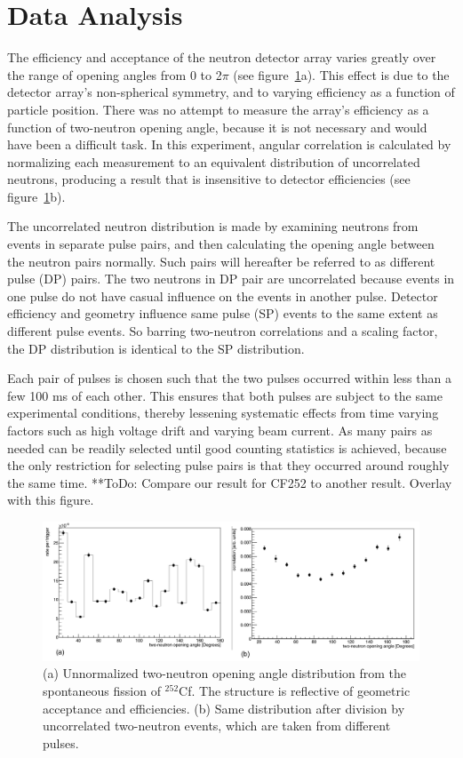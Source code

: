 \section{Data Analysis}
\label{Analysis}
The efficiency and acceptance of the neutron detector array varies greatly over the range of opening angles from 0 to 2$\pi$ (see figure~\ref{fig:OpeningAngleAcceptance}a). This effect is due to the detector array's non-spherical symmetry, and to varying efficiency as a function of particle position. There was no attempt to measure the array's efficiency as a function of two-neutron opening angle, because it is not necessary and would have been a difficult task. In this experiment, angular correlation is calculated by normalizing each measurement to an equivalent distribution of uncorrelated neutrons, producing a result that is insensitive to detector efficiencies (see figure~\ref{fig:OpeningAngleAcceptance}b). 

The uncorrelated neutron distribution is made by examining neutrons from events in separate pulse pairs, and then calculating the opening angle between the neutron pairs normally. Such pairs will hereafter be referred to as different pulse (DP) pairs. The two neutrons in DP pair are uncorrelated because events in one pulse do not have casual influence on the events in another pulse. Detector efficiency and geometry influence same pulse (SP) events to the same extent as different pulse events. So barring two-neutron correlations and a scaling factor, the DP distribution is identical to the SP distribution.

Each pair of pulses is chosen such that the two pulses occurred within less than a few 100 ms of each other. This ensures that both pulses are subject to the same experimental conditions, thereby lessening systematic effects from time varying factors such as high voltage drift and varying beam current. As many pairs as needed can be readily selected until good counting statistics is achieved, because the only restriction for selecting pulse pairs is that they occurred around roughly the same time.
**ToDo: Compare our result for CF252 to another result. Overlay with this figure.
\begin{figure}
    \centering
    \includegraphics[width  = \textwidth ]{Content/Methods/Normalization.png}
    \caption{(a) Unnormalized two-neutron opening angle distribution from the spontaneous fission of $^{252}$Cf. The structure is reflective of geometric acceptance and efficiencies. (b) Same distribution after division by uncorrelated two-neutron events, which are taken from different pulses.}
    \label{fig:OpeningAngleAcceptance}
    \label{fig:OpeningAngleAcceptance}
\end{figure}
